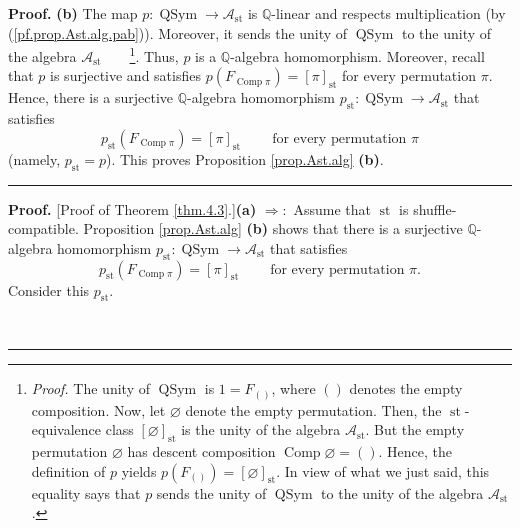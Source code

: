 \documentclass[numbers=enddot,12pt,final,onecolumn,notitlepage]{scrartcl}%
\theoremstyle{definition}
\newenvironment{proof}[1][Proof]{\noindent\textbf{#1.} }{\ \rule{0.5em}{0.5em}}
\newenvironment{verlong}{}{}
\begin{document}
\begin{verlong}
\begin{proof}
\textbf{(b)} The map $p:\operatorname*{QSym}\rightarrow\mathcal{A}%
_{\operatorname*{st}}$ is $\mathbb{Q}$-linear and respects multiplication (by
(\ref{pf.prop.Ast.alg.pab})). Moreover, it sends the unity of
$\operatorname*{QSym}$ to the unity of the algebra $\mathcal{A}%
_{\operatorname*{st}}$\ \ \ \ \footnote{\textit{Proof.} The unity of
$\operatorname*{QSym}$ is $1=F_{\left(  {}\right)  }$, where $\left(
{}\right)  $ denotes the empty composition. Now, let $\varnothing$ denote the
empty permutation. Then, the $\operatorname*{st}$-equivalence class $\left[
\varnothing\right]  _{\operatorname*{st}}$ is the unity of the algebra
$\mathcal{A}_{\operatorname*{st}}$. But the empty permutation $\varnothing$
has descent composition $\operatorname*{Comp}\varnothing=\left(  {}\right)  $.
Hence, the definition of $p$ yields $p\left(  F_{\left(  {}\right)  }\right)
=\left[  \varnothing\right]  _{\operatorname*{st}}$. In view of what we just
said, this equality says that $p$ sends the unity of $\operatorname*{QSym}$ to
the unity of the algebra $\mathcal{A}_{\operatorname*{st}}$.}. Thus, $p$ is a
$\mathbb{Q}$-algebra homomorphism. Moreover, recall that $p$ is surjective and
satisfies $p\left(  F_{\operatorname*{Comp}\pi}\right)  =\left[  \pi\right]
_{\operatorname*{st}}$ for every permutation $\pi$. Hence, there is a
surjective $\mathbb{Q}$-algebra homomorphism $p_{\operatorname*{st}%
}:\operatorname*{QSym}\rightarrow\mathcal{A}_{\operatorname*{st}}$ that
satisfies
\[
p_{\operatorname*{st}}\left(  F_{\operatorname*{Comp}\pi}\right)  =\left[
\pi\right]  _{\operatorname*{st}}\ \ \ \ \ \ \ \ \ \ \text{for every
permutation }\pi
\]
(namely, $p_{\operatorname*{st}}=p$). This proves Proposition
\ref{prop.Ast.alg} \textbf{(b)}.
\end{proof}

\begin{proof}
[Proof of Theorem \ref{thm.4.3}.]\textbf{(a)} $\Longrightarrow:$ Assume that
$\operatorname*{st}$ is shuffle-compatible. Proposition \ref{prop.Ast.alg}
\textbf{(b)} shows that there is a surjective $\mathbb{Q}$-algebra
homomorphism $p_{\operatorname*{st}}:\operatorname*{QSym}\rightarrow
\mathcal{A}_{\operatorname*{st}}$ that satisfies
\begin{equation}
p_{\operatorname*{st}}\left(  F_{\operatorname*{Comp}\pi}\right)  =\left[
\pi\right]  _{\operatorname*{st}}\ \ \ \ \ \ \ \ \ \ \text{for every
permutation }\pi. \label{pf.thm.4.3.a.fwd.pst}%
\end{equation}
Consider this $p_{\operatorname*{st}}$.


\end{proof}
\end{verlong}
\end{document}
